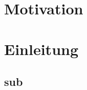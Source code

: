 \hypertarget{motivation}{%
\chapter{Motivation}\label{motivation}}

\hypertarget{einleitung}{%
\chapter{Einleitung}\label{einleitung}}

\hypertarget{sub}{%
\section{sub}\label{sub}}


